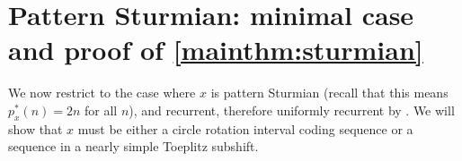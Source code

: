 \documentclass[11pt,reqno]{amsart}
\newtheorem{corollary}[theorem]{Corollary}
\theoremstyle{definition}
\theoremstyle{plain}
\newcommand{\AuthornoteR}[2]{{\sf\small\color{blue}{[#1: #2]}}}
\newcommand{\rp}{\AuthornoteR{R}}
\begin{document}








\section{Pattern Sturmian: minimal case and proof of \texorpdfstring{\cref{mainthm:sturmian}}{Theorem A}}

We now restrict to the case where $x$ is pattern Sturmian (recall that this means $p^*_x(n) = 2n$ for all $n$), and recurrent, therefore uniformly recurrent by . %
We will show that $x$ must be either a circle rotation interval coding sequence or a sequence in a nearly simple Toeplitz subshift.
\end{document}
